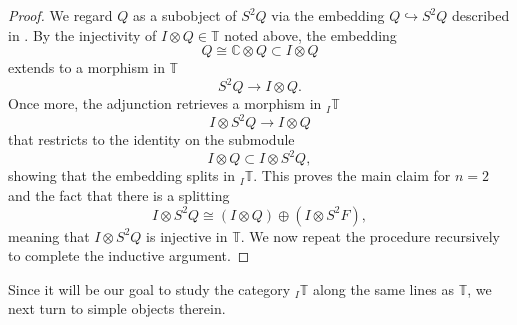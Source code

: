 \documentclass[11pt]{article}
\theoremstyle{plain}
\newtheorem{corollary}[lemma]{Corollary}
\theoremstyle{nonumberplain}
\theoremstyle{plain}
\numberwithin{equation}{section}
\theoremstyle{nonumberplain}
\newtheorem{proof}{Proof}
\newcommand\bC{{\mathbb C}}
\newcommand\bT{{\mathbb T}}
\newcommand\1{{\bf 1}}
\newcommand{\qedhere}{\mbox{}\hfill\ensuremath{\blacksquare}}
\begin{document}
\begin{proof}
  We regard $Q$ as a subobject of $S^2Q$ via the embedding $Q\hookrightarrow S^2Q$ described in . By the injectivity of $I\otimes Q\in \bT$ noted above, the embedding
  \begin{equation*}
    Q\cong \bC\otimes Q\subset I\otimes Q
  \end{equation*}
  extends to a morphism in $\bT$
  \begin{equation*}
    S^2Q\to I\otimes Q. 
  \end{equation*}
  Once more, the adjunction  retrieves a morphism in $_I\bT$
  \begin{equation*}
    I\otimes S^2Q\to I\otimes Q
  \end{equation*}
  that restricts to the identity on the submodule
  \begin{equation}\label{formula:IQ_in_IS2Q}
    I\otimes Q\subset I\otimes S^2 Q,
  \end{equation}
  showing that the embedding  splits in ${}_I\bT$. This proves the main claim for $n=2$ and the fact that there is a splitting
    \begin{equation*}
      I\otimes S^2Q\cong \left(I\otimes Q\right)\oplus \left(I\otimes S^2F\right),
    \end{equation*}
    meaning that $I\otimes S^2Q$ is injective in $\bT$. We now repeat the procedure recursively to complete the inductive argument.
\end{proof}



Since it will be our goal to study the category ${}_I\bT$ along the same lines as $\bT$, we next turn to simple objects therein.
\end{document}
